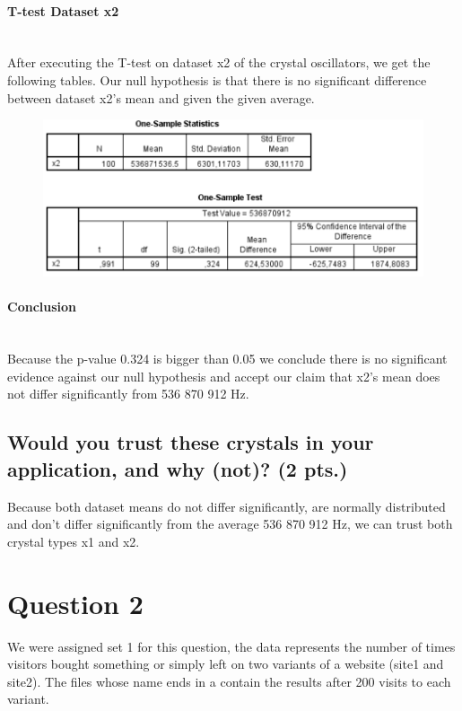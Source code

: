 \documentclass[14]{article}
\begin{document}
\paragraph{T-test Dataset x2}\mbox{}\\
After executing the T-test on dataset x2 of the crystal oscillators, we get the following tables. Our null hypothesis is that there is no significant difference between dataset x2's mean and given the given average.

\begin{figure}[!htb]
	\includegraphics[width=1.0\textwidth]{img/question1/question1_x2_T.PNG}
	\captionsetup{width=1.0\textwidth}
	\centering 
\end{figure}

\paragraph{Conclusion}\mbox{}\\
Because the p-value 0.324 is bigger than 0.05 we conclude there is no significant evidence against our null hypothesis and accept our claim that x2's mean does not differ significantly from 536 870 912 Hz.\\

\subsection{Would you trust these crystals in your application, and why (not)? (2 pts.)}
Because both dataset means do not differ significantly, are normally distributed and don't differ significantly from the average 536 870 912 Hz, we can trust both crystal types x1 and x2. 

\newpage
\section{Question 2}
We were assigned set 1 for this question, the data represents the number of times visitors bought something or simply left on two variants of a website (site1 and site2). The files whose name ends in a contain the results after 200 visits to each variant.
\end{document}
